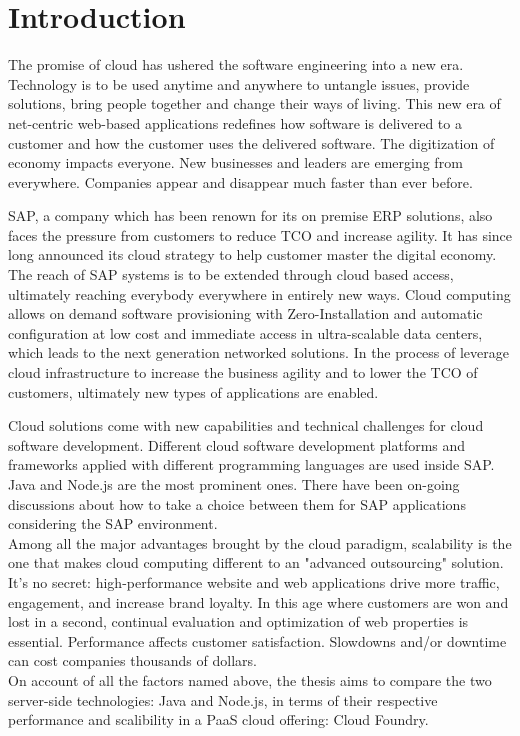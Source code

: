 \chapter{Introduction}
The promise of cloud has ushered the software engineering into a new era. Technology is to be used anytime and anywhere to untangle issues, provide solutions, bring people together and change their ways of living. This new era of net-centric web-based applications redefines how software is delivered to a customer and how the customer uses the delivered software. The digitization of economy impacts everyone. New businesses and leaders are emerging from everywhere. Companies appear and disappear much faster than ever before. 

SAP, a company which has been renown for its on premise ERP solutions, also faces the pressure from customers to reduce \ac{TCO} and increase agility. It has since long announced its cloud strategy to help customer master the digital economy. The reach of SAP systems is to be extended through cloud based access, ultimately reaching everybody everywhere in entirely new ways. Cloud computing allows on demand software provisioning with Zero-Installation and automatic configuration at low cost and immediate access in ultra-scalable data centers, which leads to the next generation networked solutions. In the process of leverage cloud infrastructure to increase the business agility and to lower the TCO of customers, ultimately new types of applications are enabled.

Cloud solutions come with new capabilities and technical challenges for cloud software development. Different cloud software development platforms and frameworks applied with different programming languages are used inside SAP. Java and Node.js are the most prominent ones. There have been on-going discussions about how to  take a choice between them for SAP applications considering the SAP environment.\\
Among all the major advantages brought by the cloud paradigm, scalability is the one that makes cloud computing different to an "advanced outsourcing" solution. It’s no secret: high-performance website and web applications drive more traffic, engagement, and increase brand loyalty. In this age where customers are won and lost in a second, continual evaluation and optimization of web properties is essential.  Performance affects customer satisfaction. Slowdowns and/or downtime can cost companies thousands of dollars.\\
On account of all the factors named above,  the thesis aims to compare the two server-side technologies: Java and Node.js, in terms of their respective performance and scalibility in a PaaS cloud offering: Cloud Foundry.






